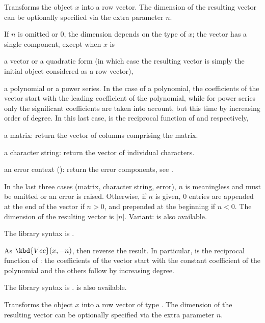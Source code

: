 \label{se:Vec}
Transforms the object $x$ into a row vector. The dimension of the
resulting vector can be optionally specified via the extra parameter $n$.

If $n$ is omitted or $0$, the dimension depends on the type of $x$; the
vector has a single component, except when $x$ is

\item a vector or a quadratic form (in which case the resulting vector
is simply the initial object considered as a row vector),

\item a polynomial or a power series. In the case of a polynomial, the
coefficients of the vector start with the leading coefficient of the
polynomial, while for power series only the significant coefficients are
taken into account, but this time by increasing order of degree.
In this last case,  is the reciprocal function of  and
 respectively,

\item a matrix: return the vector of columns comprising the matrix.

\item a character string: return the vector of individual characters.

\item an error context (): return the error components, see
.

In the last three cases (matrix, character string, error), $n$ is
meaningless and must be omitted or an error is raised. Otherwise, if $n$ is
given, $0$ entries are appended at the end of the vector if $n > 0$, and
prepended at the beginning if $n < 0$. The dimension of the resulting vector
is $|n|$. Variant:  is also available.

The library syntax is .

\label{se:Vecrev}
As $\kbd{Vec}(x, -n)$, then reverse the result. In particular,
 is the reciprocal function of : the
coefficients of the vector start with the constant coefficient of the
polynomial and the others follow by increasing degree.

The library syntax is .
 is also available.

\label{se:Vecsmall}
Transforms the object $x$ into a row vector of type . The
dimension of the resulting vector can be optionally specified via the extra
parameter $n$.

